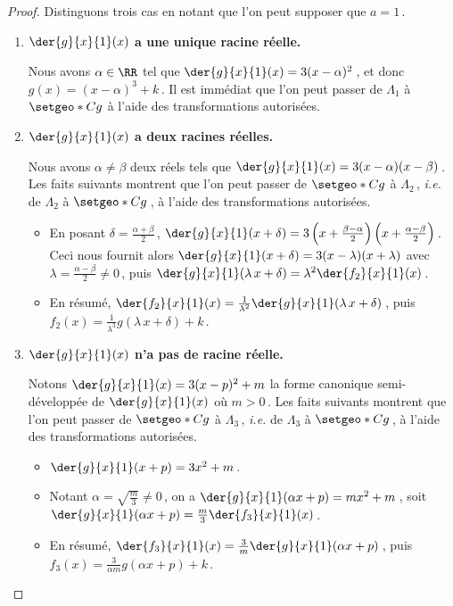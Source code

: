 \begin{proof}
	Distinguons trois cas en notant que l'on peut supposer que $a = 1$\,.
	\begin{enumerate}
		\item \textbf{$\der{g}{x}{1}(x)$ a une unique racine réelle.}

		\smallskip
		\noindent
		Nous avons $\alpha \in \RR$ tel que $\der{g}{x}{1}(x) = 3(x - \alpha)^2$\,, et donc $g(x) = (x - \alpha)^3 + k$\,.
		Il est immédiat que l'on peut passer de $\Lambda_1$ à $\setgeo*{C}{g}$ à l'aide des transformations autorisées.


		\item \textbf{$\der{g}{x}{1}(x)$ a deux racines réelles.}

		\smallskip
		\noindent
		Nous avons $\alpha \neq \beta$ deux réels tels que $\der{g}{x}{1}(x) = 3 (x - \alpha) (x - \beta)$\,.
		Les faits suivants montrent que l'on peut passer de $\setgeo*{C}{g}$ à $\Lambda_2$\,, \emph{i.e.} de $\Lambda_2$ à $\setgeo*{C}{g}$\,, à l'aide des transformations autorisées.
		\begin{itemize}
			\item En posant $\delta = \frac{\alpha + \beta}{2}$\,,
			$\der{g}{x}{1}(x + \delta) = 3 \left( x + \frac{\beta - \alpha}{2} \right) \left( x + \frac{\alpha - \beta}{2} \right)$\,.
			Ceci nous fournit alors
			$\der{g}{x}{1}(x + \delta) = 3 ( x - \lambda) (x + \lambda)$
			avec $\lambda = \frac{\alpha - \beta}{2} \neq 0$\,,
			puis
			$\der{g}{x}{1}( \lambda \, x + \delta) = \lambda^2 \der{f_2}{x}{1}(x)$\,.
			
			\item En résumé,
			$\der{f_2}{x}{1}(x) = \frac{1}{\lambda^2} \der{g}{x}{1}(\lambda \, x + \delta)$\,,
			puis
			$f_2(x) = \frac{1}{\lambda^3} g(\lambda \, x + \delta) + k$\,.
		\end{itemize}




		\item \textbf{$\der{g}{x}{1}(x)$ n'a pas de racine réelle.}

		\smallskip
		\noindent
		Notons $\der{g}{x}{1}(x) = 3(x - p)^2 + m$ la forme canonique semi-développée de $\der{g}{x}{1}(x)$ où $m > 0$\,.
		Les faits suivants montrent que l'on peut passer de $\setgeo*{C}{g}$ à $\Lambda_3$\,, \emph{i.e.} de $\Lambda_3$ à $\setgeo*{C}{g}$\,, à l'aide des transformations autorisées.
		\begin{itemize}
			\item $\der{g}{x}{1}(x + p) = 3 x^2 + m$\,.
			
			\item Notant $\alpha = \sqrt{\frac{m}{3}} \neq 0$\,, on a
			$\der{g}{x}{1}(\alpha x + p) = m x^2 + m$\,,
			soit
			$\der{g}{x}{1}(\alpha x + p) = \frac{m}{3} \der{f_3}{x}{1}(x)$\,.
			
			\item En résumé,
			$\der{f_3}{x}{1}(x) = \frac{3}{m} \der{g}{x}{1}(\alpha x + p)$\,,
			puis
			$f_3(x) = \frac{3}{\alpha m} g(\alpha x + p) + k$\,.
		\end{itemize}
	\end{enumerate}
\end{proof}


